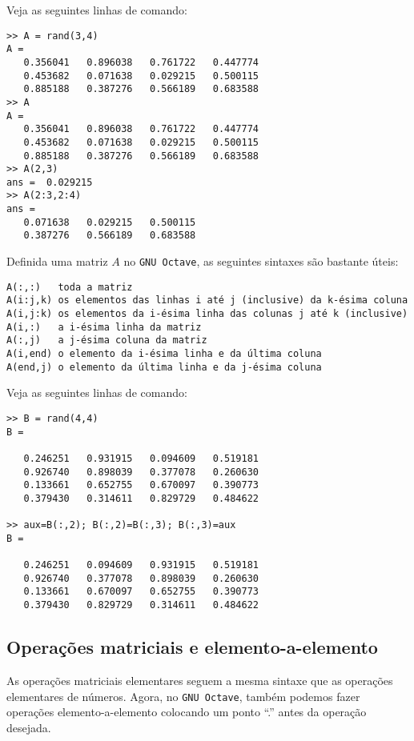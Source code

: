 \begin{ex}
  Veja as seguintes linhas de comando:
\begin{verbatim}
>> A = rand(3,4)
A =
   0.356041   0.896038   0.761722   0.447774
   0.453682   0.071638   0.029215   0.500115
   0.885188   0.387276   0.566189   0.683588
>> A
A =
   0.356041   0.896038   0.761722   0.447774
   0.453682   0.071638   0.029215   0.500115
   0.885188   0.387276   0.566189   0.683588
>> A(2,3)
ans =  0.029215
>> A(2:3,2:4)
ans =
   0.071638   0.029215   0.500115
   0.387276   0.566189   0.683588
\end{verbatim}
\end{ex}

Definida uma matriz $A$ no \verb+GNU Octave+, as seguintes sintaxes são bastante úteis:
\begin{verbatim}
A(:,:)   toda a matriz
A(i:j,k) os elementos das linhas i até j (inclusive) da k-ésima coluna
A(i,j:k) os elementos da i-ésima linha das colunas j até k (inclusive)
A(i,:)   a i-ésima linha da matriz
A(:,j)   a j-ésima coluna da matriz
A(i,end) o elemento da i-ésima linha e da última coluna
A(end,j) o elemento da última linha e da j-ésima coluna
\end{verbatim}

\begin{ex}
Veja as seguintes linhas de comando:
\begin{verbatim}
>> B = rand(4,4)
B =

   0.246251   0.931915   0.094609   0.519181
   0.926740   0.898039   0.377078   0.260630
   0.133661   0.652755   0.670097   0.390773
   0.379430   0.314611   0.829729   0.484622

>> aux=B(:,2); B(:,2)=B(:,3); B(:,3)=aux
B =

   0.246251   0.094609   0.931915   0.519181
   0.926740   0.377078   0.898039   0.260630
   0.133661   0.670097   0.652755   0.390773
   0.379430   0.829729   0.314611   0.484622
\end{verbatim}
\end{ex}

\subsection{Operações matriciais e elemento-a-elemento}

As operações matriciais elementares seguem a mesma sintaxe que as operações elementares de números. Agora, no \verb+GNU Octave+, também podemos fazer operações elemento-a-elemento colocando um ponto ``.'' antes da operação desejada.

